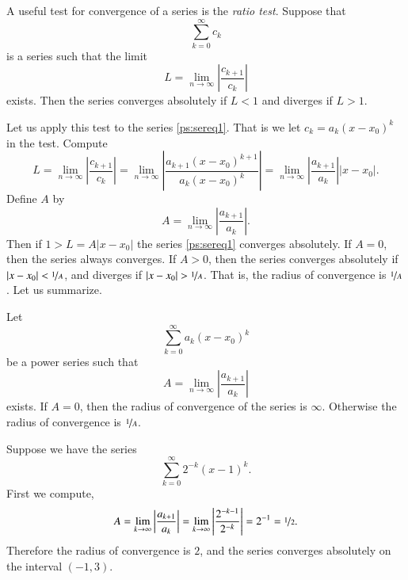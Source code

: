 \documentclass[12pt]{book}
\begin{document}
A useful test for convergence of a series is the
\emph{ratio test}.  Suppose that
\begin{equation*}
\sum_{k=0}^\infty c_k
\end{equation*}
is a series such that the limit
\begin{equation*}
L = \lim_{n\to\infty} \left \lvert \frac{c_{k+1}}{c_k} \right \rvert
\end{equation*}
exists.  Then the series converges absolutely if $L < 1$ and diverges
if $L > 1$.

Let us apply this test to the series \eqref{ps:sereq1}.  That is
we let $c_k = a_k {(x - x_0)}^k$ in the test.  Compute
\begin{equation*}
L = \lim_{n\to\infty} \left \lvert \frac{c_{k+1}}{c_k} \right \rvert
=
\lim_{n\to\infty} \left \lvert
\frac{a_{k+1} {(x - x_0)}^{k+1}}{a_k {(x - x_0)}^k}
\right \rvert
=
\lim_{n\to\infty} \left \lvert
\frac{a_{k+1}}{a_k}
\right \rvert
\lvert  x - x_0 \rvert .
\end{equation*}
Define $A$ by
\begin{equation*}
A =
\lim_{n\to\infty} \left \lvert
\frac{a_{k+1}}{a_k}
\right \rvert .
\end{equation*}
Then if $1 > L = A \lvert x - x_0 \rvert$ the series \eqref{ps:sereq1}
converges absolutely.
If $A = 0$, then the series always converges.  If $A > 0$, then
the series converges absolutely
if $\lvert x - x_0 \rvert < \nicefrac{1}{A}$,
and diverges if $\lvert x - x_0 \rvert > \nicefrac{1}{A}$.  That is,
the radius of convergence is $\nicefrac{1}{A}$.  Let us summarize.

\begin{theorem}
Let
\begin{equation*}
\sum_{k=0}^\infty a_k {(x-x_0)}^k
\end{equation*}
be a power series such that
\begin{equation*}
A =
\lim_{n\to\infty}
\left \lvert
\frac{a_{k+1}}{a_k}
\right \rvert
\end{equation*}
exists.  If $A = 0$, then the radius of convergence of the series
is $\infty$.  Otherwise the radius of convergence is $\nicefrac{1}{A}$.
\end{theorem}

\begin{example}
Suppose we have the series
\begin{equation*}
\sum_{k=0}^\infty 2^{-k} {(x-1)}^k .
\end{equation*}
First we compute,
\begin{equation*}
A = \lim_{k\to\infty} 
\left \lvert
\frac{a_{k+1}}{a_k}
\right \rvert
=
\lim_{k\to\infty} 
\left \lvert
\frac{2^{-k-1}}{2^{-k}}
\right \rvert
=
2^{-1} = \nicefrac{1}{2}.
\end{equation*}
Therefore the radius of convergence is $2$, and the series
converges absolutely on the interval $(-1,3)$.
\end{example}
\end{document}
